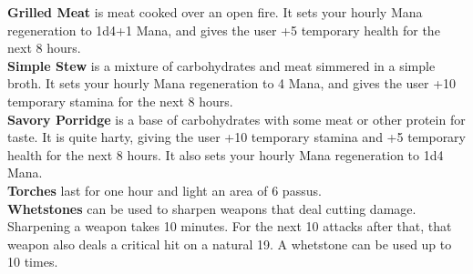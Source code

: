 \textbf{Grilled Meat} is meat cooked over an open fire. It sets your hourly Mana regeneration to 1d4+1 Mana, and gives the user +5 temporary health for the next 8 hours.\\


\textbf{Simple Stew} is a mixture of carbohydrates and meat simmered in a simple broth. It sets your hourly Mana regeneration to 4 Mana, and gives the user +10 temporary stamina for the next 8 hours.\\


\textbf{Savory Porridge} is a base of carbohydrates with some meat or other protein for taste. It is quite harty, giving the user +10 temporary stamina and +5 temporary health for the next 8 hours. It also sets your hourly Mana regeneration to 1d4 Mana.\\


\textbf{Torches} last for one hour and light an area of 6 passus.\\


\textbf{Whetstones} can be used to sharpen weapons that deal cutting damage. Sharpening a weapon takes 10 minutes. For the next 10 attacks after that, that weapon also deals a critical hit on a natural 19. A whetstone can be used up to 10 times.\\